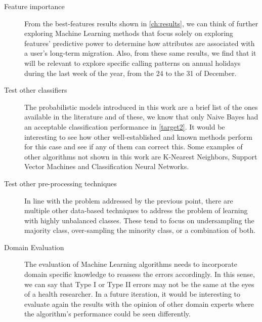 \begin{description}
    \item [Feature importance] From the best-features results shown in \cref{ch:results}, we can think of further exploring Machine Learning methods that focus solely on exploring features' predictive power to determine how attributes are associated with a user's long-term migration. 
    Also, from these same results, we find that it will be relevant to explore specific calling patterns on annual holidays during the last week of the year, from the 24 to the 31 of December.

    \item [Test other classifiers] The probabilistic models introduced in this work are a brief list of the ones available in the literature and of these, we know that only Naive Bayes had an acceptable classification performance in \cref{target2}.
    It would be interesting to see how other well-established and known methods perform for this case and see if any of them can correct this.
    Some examples of other algorithms not shown in this work are K-Nearest Neighbors, Support Vector Machines and Classification Neural Networks.

    \item [Test other pre-processing techniques] In line with the problem addressed by the previous point, there are multiple other data-based techniques to address the problem of learning with highly unbalanced classes.
    These tend to focus on undersampling the majority class, over-sampling the minority class, or a combination of both.


    \item [Domain Evaluation] The evaluation of Machine Learning algorithms needs to incorporate domain specific knowledge to reassess the errors accordingly. In this sense, we can say that Type I or Type II errors may not be the same at the eyes of a health researcher.
    In a future iteration, it would be interesting to evaluate again the results with the opinion of other domain experts where the algorithm's performance could be seen differently.

\end{description}

